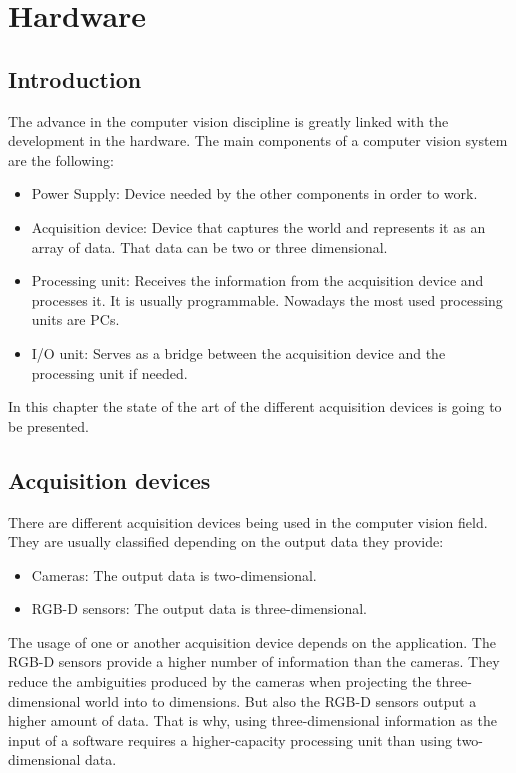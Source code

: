 \chapter*{Hardware}

 
\section*{Introduction}
The advance in the computer vision discipline is greatly linked with the development in the hardware. The main components of a computer vision system are the following: 

\begin{itemize}
	\item{Power Supply: } Device needed by the other components in order to work. 
	\item{Acquisition device: } Device that captures the world and represents it as an array of data. That data can be two or three dimensional. 
	\item{Processing unit:} Receives the information from the acquisition device and processes it. It is usually programmable. Nowadays the most used processing units are PCs. 
	\item{I/O unit: } Serves as a bridge between the acquisition device and the processing unit if needed. 

\end{itemize}

In this chapter the state of the art of the different acquisition devices is going to be presented. 

\section*{Acquisition devices}
There are different acquisition devices being used in the computer vision field. They are usually classified depending on the output data they provide: 

\begin{itemize}
	\item{Cameras:}	The output data is two-dimensional. 
	\item{RGB-D sensors:} The output data is three-dimensional. 
\end{itemize}

The usage of one or another acquisition device depends on the application. The RGB-D sensors provide a higher number of information than the cameras. They reduce the ambiguities produced by the cameras when projecting the three-dimensional world into to dimensions. But also the RGB-D sensors output a higher amount of data. 
That is why, using three-dimensional information as the input of a software requires a higher-capacity processing unit than using two-dimensional data.



